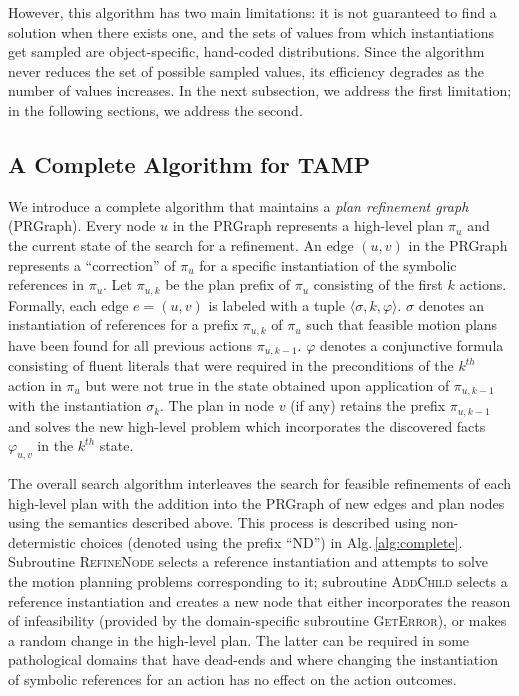 However, this algorithm has two
main limitations: it is not guaranteed to find a solution when
there exists one, and the sets of values from which instantiations
get sampled are object-specific, hand-coded distributions. Since the algorithm
never reduces the set of possible sampled values, its
efficiency degrades as the number of values increases. In the next subsection,
we address the first limitation; in the following sections, we address the second.

\subsection{A Complete Algorithm for TAMP}
We introduce a complete algorithm that maintains a \emph{plan
  refinement graph} (PRGraph). Every node $u$ in the PRGraph
represents a high-level plan $\pi_u$ and the current state of the search
for a refinement. An edge $(u,v)$ in the PRGraph
represents a ``correction'' of $\pi_u$ for a specific instantiation of
the symbolic references in $\pi_u$. Let $\pi_{u,k}$ be the plan prefix of
$\pi_u$ consisting of the first $k$ actions. Formally, each edge
$e=(u,v)$ is labeled with a tuple $\langle \sigma, k, \varphi \rangle$.
$\sigma$ denotes an instantiation of references for a prefix $\pi_{u,k}$ of
$\pi_u$ such that feasible motion plans have been found for all
previous actions $\pi_{u,k-1}$. $\varphi$ denotes a conjunctive formula
consisting of fluent literals
that were required in the preconditions of the $k^{th}$ action in
$\pi_u$ but were not true in the state obtained upon
application of $\pi_{u,k-1}$ with the instantiation $\sigma_k$.  The
plan in node $v$ (if any) retains the prefix $\pi_{u,k-1}$ and solves
the new high-level problem which incorporates the discovered facts $\varphi_{u,v}$
in the $k^{th}$ state.

The overall search algorithm interleaves the search for feasible
refinements of each high-level plan with the addition into the
PRGraph of new edges and plan nodes using the semantics described
above. This process is described using non-determistic choices
(denoted using the prefix ``ND'') in
Alg.\,\ref{alg:complete}. Subroutine \textsc{RefineNode} selects a
reference instantiation and attempts to solve the motion planning
problems corresponding to it; subroutine \textsc{AddChild} selects a
reference instantiation and creates a new node that either
incorporates the reason of infeasibility (provided by the
domain-specific subroutine \textsc{GetError}), or makes a random
change in the high-level plan. The latter can be required in some
pathological domains that have dead-ends and where changing the
instantiation of symbolic references for an action has no effect on the
action outcomes.

